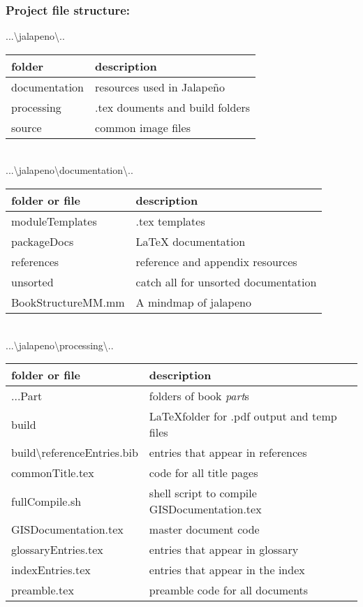 \documentclass[class=book , crop=false]{standalone}
\begin{document}
\subsubsection{Project file structure:}
{\Large ...\textbackslash jalapeno\textbackslash..}\\
\begin{tabular}{p{4cm}| p{7cm} }
\footnotesize folder & {\footnotesize description} \\ \hline
documentation & resources used in Jalape\~no\\
processing & .tex douments and build folders\\
source & common image files\\
\end{tabular}
\bigskip\\
{\Large ...\textbackslash jalapeno\textbackslash documentation\textbackslash..}\\
\begin{tabular}{p{4cm} | p{7cm} }
\footnotesize folder or file & {\footnotesize description} \\ \hline
moduleTemplates & .tex templates\\
packageDocs & \LaTeX{} documentation\\
references & reference and appendix resources\\
unsorted & catch all for unsorted documentation\\
BookStructureMM.mm & A mindmap of jalapeno\\
\end{tabular}
\bigskip\\
{\Large ...\textbackslash jalapeno\textbackslash processing\textbackslash..}\\
\begin{tabular}{p{4cm}| p{7cm} }
\footnotesize folder or file & {\footnotesize description }\\ \hline
...Part & folders of book \textit{part}s\\
build & \LaTeX{}folder for .pdf output and temp files \\
build\textbackslash referenceEntries.bib & entries that appear in references\\
commonTitle.tex & code for all title pages\\
fullCompile.sh & shell script to compile GISDocumentation.tex\\
GISDocumentation.tex & master document code\\
glossaryEntries.tex & entries that appear in glossary\\
indexEntries.tex & entries that appear in the index\\
preamble.tex & preamble code for all documents\\
\end{tabular}
\end{document}
